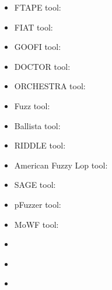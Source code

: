 
\newcommand{\FTAPE}{\cite{tsai1999stress}}
\newcommand{\FIAT}{\cite{barton1990fault}}
\newcommand{\GOOFI}{\cite{aidemark2001goofi}}
\newcommand{\DOCTOR}{\cite{han1995doctor}}
\newcommand{\ORCHESTRA}{\cite{dawson1996testing}}
\newcommand{\Fuzz}{\cite{miller1995fuzz}}
\newcommand{\Ballista}{\cite{koopman2000exception}}
\newcommand{\RIDDLE}{\cite{ghosh1998testing}}
\newcommand{\AFL}{\cite{gutmann2016fuzzing}}
\newcommand{\SAGE}{\cite{godefroid2012sage}}
\newcommand{\pFuzzer}{\cite{mathis2019parser}} 
\newcommand{\MoWF}{\cite{pham2016model}}
\newcommand{\DiNardoICST}{\cite{di2015generating}}
\newcommand{\DiNardoASE}{\cite{di2015evolutionary}}
\newcommand{\Matinnejad}{\cite{Matinnejad19}}

\begin{itemize}
	\item FTAPE tool: \cite{tsai1999stress}
	\item FIAT tool: \cite{barton1990fault}
	\item GOOFI tool: \cite{aidemark2001goofi}
	\item DOCTOR tool: \cite{han1995doctor}
	\item ORCHESTRA tool: \cite{dawson1996testing}
	\item Fuzz tool:\cite{miller1995fuzz}
	\item Ballista tool: \cite{koopman2000exception}
	\item RIDDLE tool: \cite{ghosh1998testing}
	\item American Fuzzy Lop tool: \cite{gutmann2016fuzzing}
	\item SAGE tool: \cite{godefroid2012sage}
	\item pFuzzer tool: \cite{mathis2019parser}
	\item MoWF tool: \cite{pham2016model}
	\item \cite{di2015generating}
	\item \cite{di2015evolutionary}
	\item \cite{Matinnejad19}
\end{itemize}

